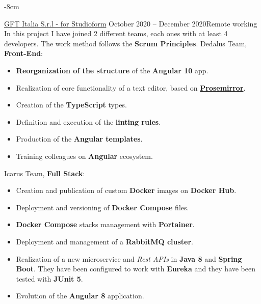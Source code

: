 \documentclass[10pt,a4paper]{altacv}
\begin{document}


\begin{adjustwidth}{}{-8cm}
\makecvheader
\end{adjustwidth}


{\href{https://studioform.org/}{GFT Italia S.r.l - for Studioform}}
{October 2020 -- December 2020}{Remote working}
In this project I have joined 2 different teams, each ones with at least 4 developers.
\newline
The work method follows the \textbf{Scrum Principles}.
\newline\newline
Dedalus Team, \textbf{Front-End}:
\begin{itemize}
	\item \textbf{Reorganization of the structure} of the \textbf{Angular 10} app.
	\item Realization of core functionality of a text editor, based on \textbf{\href{https://prosemirror.net/}{Prosemirror}}.
	\item Creation of the \textbf{TypeScript} types.
	\item Definition and execution of the \textbf{linting rules}.
	\item Production of the \textbf{Angular templates}.
	\item Training colleagues on \textbf{Angular} ecosystem.
\end{itemize}
\leavevmode \newline
Icarus Team, \textbf{Full Stack}:
\begin{itemize}
	\item Creation and publication of custom \textbf{Docker} images on \textbf{Docker Hub}.
	\item Deployment and versioning of \textbf{Docker Compose} files.
	\item \textbf{Docker Compose} stacks management with \textbf{Portainer}.
	\item Deployment and management of a \textbf{RabbitMQ cluster}.
	\item Realization of a new microservice and \textit{Rest APIs} in \textbf{Java 8} and \textbf{Spring Boot}.
	They have been configured to work with \textbf{Eureka} and they have been tested with \textbf{JUnit 5}.
	\item Evolution of the \textbf{Angular 8} application.
\end{itemize}
\divider
\end{document}
